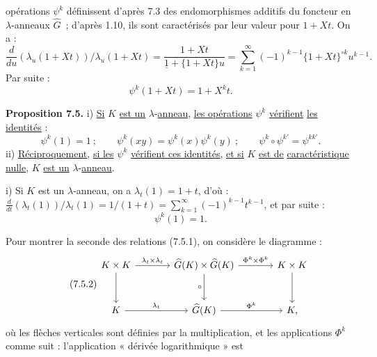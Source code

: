 
opérations \(\psi^k\)
définissent d'après 7.3 des endomorphismes additifs du foncteur en \(\lambda\)-anneaux \(\widehat G\)~; d'après 1.10, ils sont caractérisés par leur valeur pour \(1+Xt\). On a :
\[
  \frac{d}{du}(\lambda_u(1+Xt))/\lambda_u(1+Xt)
  =
  \frac{1+Xt}{\underline{1}+\{1+Xt\}u}
  =
  \sum_{k=1}^{\infty}(-1)^{k-1}\{1+Xt\}^{\circ k}u^{k-1}.
\]
Par suite :
\begin{equation}\tag{7.4.1}
  \psi^k(1+Xt)=1+X^k t.
\end{equation}

\textbf{Proposition 7.5.} i) \uline{Si} \(K\) \uline{est un} \(\lambda\)-\uline{anneau}, \uline{les opérations} \(\psi^k\) \uline{vérifient} \uline{les identités} :
\begin{equation}\tag{7.5.1}
  \psi^k(1)=1~;\qquad
  \psi^k(xy)=\psi^k(x)\psi^k(y)~;\qquad
  \psi^k\circ\psi^{k'}=\psi^{kk'}.
\end{equation}
ii) \uline{Réciproquement}, \uline{si les} \(\psi^k\) \uline{vérifient ces identités}, \uline{et si} \(K\) \uline{est de} \uline{caractéristique nulle}, \(K\) \uline{est un} \(\lambda\)-\uline{anneau}.

i) Si \(K\) est un \(\lambda\)-anneau, on a \(\lambda_t(1)=1+t\), d'où : \(\frac{d}{dt}(\lambda_t(1))/\lambda_t(1)=1/(1+t)=\sum_{k=1}^{\infty}(-1)^{k-1}t^{k-1}\), et par suite :
\[
  \psi^k(1)=1.
\]

Pour montrer la seconde des relations (7.5.1), on considère le diagramme :
\begin{equation}\tag{7.5.2}
\begin{tikzcd}[column sep=large,row sep=large]
K\times K \arrow[r,"\lambda_t\times\lambda_t"] \arrow[d] &
\widehat G(K)\times\widehat G(K) \arrow[r,"\Phi^k\times\Phi^k"] \arrow[d,"\circ"'] &
K\times K \arrow[d]\\
K \arrow[r,"\lambda_t"] &
\widehat G(K) \arrow[r,"\Phi^k"] &
K ,
\end{tikzcd}
\end{equation}
où les flèches verticales sont définies par la multiplication, et les applications \(\Phi^k\) comme suit : l'application « dérivée logarithmique » est
